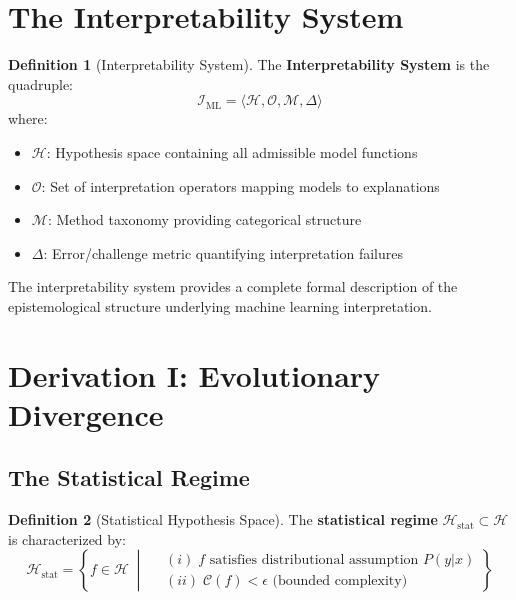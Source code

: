 \documentclass[11pt,a4paper]{article}
\theoremstyle{definition}
\newtheorem{definition}{Definition}[section]
\newcommand{\Hstat}{\mathcal{H}_{\text{stat}}}
\newcommand{\IML}{\mathcal{I}_{\text{ML}}}
\newcommand{\Complex}{\mathcal{C}}
\begin{document}
\section{The Interpretability System}

\begin{definition}[Interpretability System]
The \textbf{Interpretability System} is the quadruple:
\begin{equation}
\boxed{\IML = \langle \mathcal{H}, \mathcal{O}, \mathcal{M}, \Delta \rangle}
\end{equation}
where:
\begin{itemize}    \item $\mathcal{H}$: Hypothesis space containing all admissible model functions
    \item $\mathcal{O}$: Set of interpretation operators mapping models to explanations
    \item $\mathcal{M}$: Method taxonomy providing categorical structure
    \item $\Delta$: Error/challenge metric quantifying interpretation failures
\end{itemize}
\end{definition}

The interpretability system provides a complete formal description of the epistemological structure underlying machine learning interpretation.

\section{Derivation I: Evolutionary Divergence}
\label{sec:evolutionary_divergence}

\subsection{The Statistical Regime}

\begin{definition}[Statistical Hypothesis Space]
The \textbf{statistical regime} $\Hstat \subset \mathcal{H}$ is characterized by:
\begin{equation}
\Hstat = \left\{ f \in \mathcal{H} \;\middle|\;
\begin{aligned}
&(i)\; f \text{ satisfies distributional assumption } P(y|x) \\
&(ii)\; \Complex(f) < \epsilon \text{ (bounded complexity)}
\end{aligned}
\right\}
\end{equation}
\end{definition}
\end{document}
